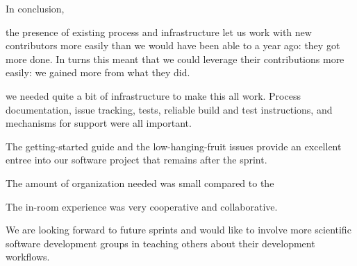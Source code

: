 \documentclass[12pt]{article}
\begin{document}


In conclusion,

the presence of existing process and infrastructure let us work with
new contributors more easily than we would have been able to a year
ago: they got more done.  In turns this meant that we could leverage
their contributions more easily: we gained more from what they did.

we needed quite a bit of infrastructure to make this all work.
Process documentation, issue tracking, tests, reliable build and test
instructions, and mechanisms for support were all important.

The getting-started guide and the low-hanging-fruit issues provide an
excellent entree into our software project that remains after the sprint.







The amount of organization needed was small compared to the 

The in-room experience was very cooperative and collaborative.

We are looking forward to future sprints and would like to involve more
scientific software development groups in teaching others about their
development workflows.


\end{document}
